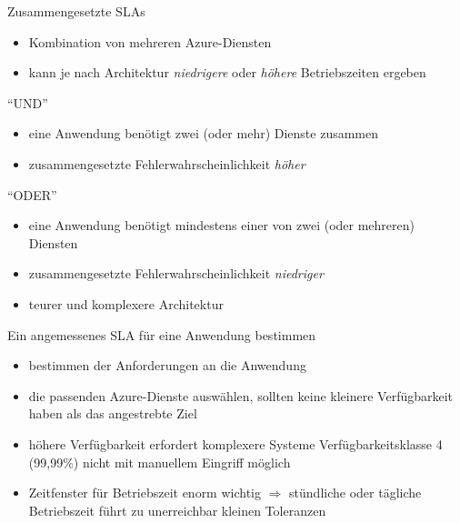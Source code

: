 \begin{flashcard}[\ ]{Zusammengesetzte SLAs}
    \begin{itemize}
        \item Kombination von mehreren Azure-Diensten
        \item kann je nach Architektur \emph{niedrigere} oder \emph{höhere} Betriebszeiten ergeben
    \end{itemize}
    ``UND''
    \begin{itemize}
        \item eine Anwendung benötigt zwei (oder mehr) Dienste zusammen
        \item zusammengesetzte Fehlerwahrscheinlichkeit \emph{höher}
    \end{itemize}
    ``ODER''
    \begin{itemize}
        \item eine Anwendung benötigt mindestens einer von zwei (oder mehreren) Diensten
        \item zusammengesetzte Fehlerwahrscheinlichkeit \emph{niedriger}
        \item teurer und komplexere Architektur
    \end{itemize}
\end{flashcard}

\begin{flashcard}[Beschreibe]{Ein angemessenes SLA für eine Anwendung bestimmen}
        \begin{itemize}
            \item bestimmen der Anforderungen an die Anwendung
            \item die passenden Azure-Dienste auswählen, sollten keine kleinere Verfügbarkeit haben als das angestrebte Ziel
            \item höhere Verfügbarkeit erfordert komplexere Systeme\newline
            Verfügbarkeitsklasse 4 (99,99\%) nicht mit manuellem Eingriff möglich
            \item Zeitfenster für Betriebszeit enorm wichtig\newline
            $\Rightarrow$ stündliche oder tägliche Betriebszeit führt zu unerreichbar kleinen Toleranzen
        \end{itemize}
\end{flashcard}
